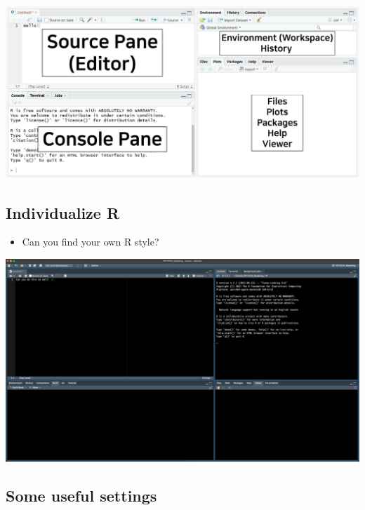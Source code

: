 \documentclass[
]{book}
\providecommand{\tightlist}{%
  \setlength{\itemsep}{0pt}\setlength{\parskip}{0pt}}
\begin{document}
\includegraphics{./img/second_glance.jpg}

\subsection{Individualize R}\label{individualize-r}

\begin{itemize}
\tightlist
\item
  Can you find your own R style?
\end{itemize}

\includegraphics{./img/third_glance.png}

\subsection{Some useful settings}\label{some-useful-settings}
\end{document}
